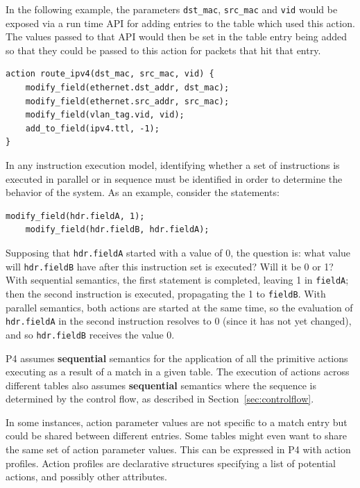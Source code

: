 \documentclass[12pt]{article}
\begin{document}
In the following example, the parameters \texttt{dst_mac}, \texttt{src_mac} and \texttt{vid} would
be exposed via a run time API for adding entries to the table which used this
action. The values passed to that API would then be set in the table entry
being added so that they could be passed to this action for packets that hit
that entry.

\begin{lstlisting}[keywords={},frame=single,escapechar=\@]
action route_ipv4(dst_mac, src_mac, vid) {
    modify_field(ethernet.dst_addr, dst_mac);
    modify_field(ethernet.src_addr, src_mac);
    modify_field(vlan_tag.vid, vid);
    add_to_field(ipv4.ttl, -1);
}
\end{lstlisting}


In any instruction execution model, identifying whether a set of instructions
is executed in parallel or in sequence must be identified in order to determine
the behavior of the system. As an example, consider the statements:

\begin{lstlisting}[keywords={},frame=single,escapechar=\@]
    modify_field(hdr.fieldA, 1);
    modify_field(hdr.fieldB, hdr.fieldA);
\end{lstlisting}


Supposing that \texttt{hdr.fieldA} started with a value of 0, the question is: what
value will \texttt{hdr.fieldB} have after this instruction set is executed? Will
it be 0 or 1? With sequential semantics, the first statement is completed,
leaving 1 in \texttt{fieldA}; then the second instruction is executed, propagating
the 1 to \texttt{fieldB}.  With parallel semantics, both actions are started at the
same time, so the evaluation of \texttt{hdr.fieldA} in the second instruction resolves
to 0 (since it has not yet changed), and so \texttt{hdr.fieldB} receives the value
0.

P4 assumes \textbf{sequential} semantics for the application of all the primitive actions
executing as a result of a match in a given table. The execution of actions
across different tables also assumes \textbf{sequential} semantics where the sequence is
determined by the control flow, as described in Section~\ref{sec:controlflow}.


In some instances, action parameter values are not specific to a match entry but
could be shared between different entries. Some tables might even want to share
the same set of action parameter values. This can be expressed in P4 with
action profiles.
Action profiles are declarative structures specifying a list of potential
actions, and possibly other attributes.
\end{document}
